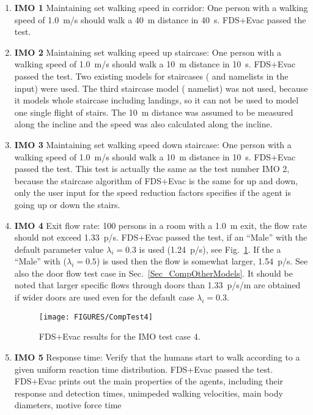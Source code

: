 \documentclass[12pt,a4paper,final,twoside]{stylevk}
\begin{document}
%
\begin{enumerate}
%
\item \textbf{IMO 1} Maintaining set walking speed in corridor: One
  person with a walking speed of 1.0~m/s should walk a 40~m distance
  in 40~s.  FDS+Evac passed the test.
%
\item \textbf{IMO 2} Maintaining set walking speed up staircase: One
  person with a walking speed of 1.0~m/s should walk a 10~m distance
  in 10~s.  FDS+Evac passed the test.  Two existing models for
  staircases ( and  namelists in the
  input) were used.  The third staircase model (
  namelist) was not used, because it models whole staircase including
  landings, so it can not be used to model one single flight of
  stairs.  The 10~m distance was assumed to be measured along the
  incline and the speed was also calculated along the incline.
%
\item \textbf{IMO 3} Maintaining set walking speed down staircase: One
  person with a walking speed of 1.0~m/s should walk a 10~m distance
  in 10~s.  FDS+Evac passed the test.  This test is actually the same
  as the test number IMO 2, because the staircase algorithm of
  FDS+Evac is the same for up and down, only the user input for the
  speed reduction factors specifies if the agent is going up or down
  the stairs.
%
\item \textbf{IMO 4} Exit flow rate: 100 persons in a room with a
  1.0~m exit, the flow rate should not exceed 1.33~p/s.  FDS+Evac
  passed the test, if an ``Male'' with the default parameter value
  $\lambda_i=0.3$ is used (1.24~p/s), see Fig.~\ref{Fig_CompTest4}.
  If the a ``Male'' with ($\lambda_i=0.5$) is used then the flow is
  somewhat larger, 1.54~p/s.  See also the door flow test case in
  Sec.~\ref{Sec_CompOtherModels}.  It should be noted that larger
  specific flows through doors than 1.33~p/s/m are obtained if wider
  doors are used even for the default case $\lambda_i=0.3$.
%
%
\begin{figure}[!tb]
  \centerline{\texttt{[image: FIGURES/CompTest4]}} 
  \caption{FDS+Evac results for the IMO test case
  4.}\label{Fig_CompTest4}  
\end{figure}
%
%
\item \textbf{IMO 5} Response time: Verify that the humans start to
  walk according to a given uniform reaction time distribution.
  FDS+Evac passed the test.  FDS+Evac prints out the main properties
  of the agents, including their response and detection times,
  unimpeded walking velocities, main body diameters, motive force time

\end{enumerate}
\end{document}
